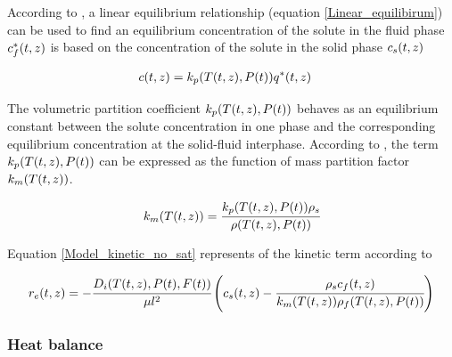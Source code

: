 \documentclass[../Article_Model_Parameters.tex]{subfiles}
\begin{document}
		According to \citet{Bulley1984}, a linear equilibrium relationship (equation  \ref{Linear_equilibirum}) can be used to find an equilibrium concentration of the solute in the fluid phase ${\color{black}c_f^*}(t,z)$ is based on the concentration of the solute in the solid phase ${\color{black}c_s}(t,z)$ 
			
			{\footnotesize
				\begin{align} \label{Linear_equilibirum}
					{\color{black}c}(t,z) &= {\color{black}k_p}({\color{black}T}(t,z),{\color{black}P}(t)) \allowbreak {\color{black}q^*}(t,z)
			\end{align} }
			
			The volumetric partition coefficient ${\color{black}k_p}({\color{black}T}(t,z),{\color{black}P}(t))$ behaves as an equilibrium constant between the solute concentration in one phase and the corresponding equilibrium concentration at the solid-fluid interphase. According to \citet{Spiro2007}, the term ${\color{black}k_p}({\color{black}T}(t,z),{\color{black}P}(t))$ can be expressed as the function of mass partition factor ${\color{black}k_m}({\color{black}T}(t,z))$.
			
			{\footnotesize
				\begin{align}
					{\color{black}k_m}({\color{black}T}(t,z)) = \cfrac{{\color{black}k_p}({\color{black}T}(t,z),{\color{black}P}(t)) {\color{black}\rho_s}}{{\color{black}\rho}({\color{black}T}(t,z),{\color{black}P}(t))}
			\end{align} }
			
			Equation \ref{Model_kinetic_no_sat} represents of the kinetic term according to \citet{Reverchon1996}
			
			{\footnotesize
				\begin{equation}
					\label{Model_kinetic_no_sat}
					{\color{black}r_e}(t,z) = -\cfrac{{\color{black}D_i}({\color{black}T}(t,z), {\color{black}P}(t), F(t))}{{\color{black} \mu l^2} }\left({\color{black}c_s}(t,z) - \cfrac{{\color{black}\rho_s}c_f(t,z)}{{\color{black}k_m}({\color{black}T}(t,z)){\color{black}\rho_f}({\color{black}T}(t,z),{\color{black}P}(t))}   \right)
			\end{equation} }

        
		
		\iffalse	
		\subsubsection{Heat balance} \label{CH: heat_balance}
		
\end{document}
